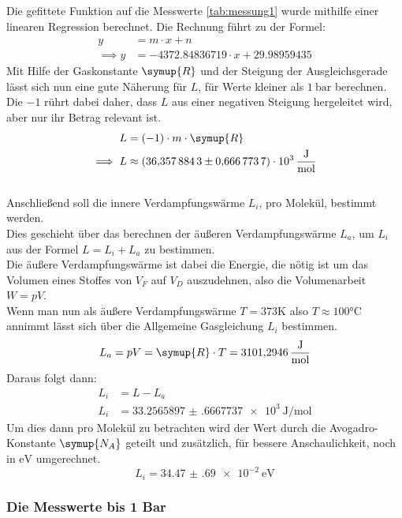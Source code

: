 Die gefittete Funktion auf die Messwerte \ref{tab:messung1} wurde mithilfe einer linearen Regression berechnet.
Die Rechnung führt zu der Formel:
\begin{align}
    y&=m\cdot x+n \nonumber\\
    \implies y&=-4372.84836719 \cdot x+29.98959435 \nonumber
\end{align}
Mit Hilfe der Gaskonstante $\symup{R}$ \cite{Chemie.de-Gaskonstante}
und der Steigung der Ausgleichsgerade lässt sich nun eine gute Näherung für $L$, für Werte kleiner als $\SI{1}{\bar}$ berechnen.
Die $-1$ rührt dabei daher, dass $L$ aus einer negativen Steigung hergeleitet wird, aber nur ihr Betrag relevant ist.
\begin{align}
    L&=(-1) \cdot m \cdot \symup{R} \nonumber\\
    \implies L&\approx\SI{36.3578843(6667737)e3}{\joule\per\mol} \nonumber
\end{align}\\
Anschließend soll die innere Verdampfungswärme $L_i$, pro Molekül, bestimmt werden.\\
Dies geschieht über das berechnen der äußeren Verdampfungswärme $L_a$, um $L_i$ aus der Formel $L=L_i+L_a$ zu bestimmen.\\
Die äußere Verdampfungswärme ist dabei die Energie, die nötig ist um das Volumen eines Stoffes von $V_F$ auf $V_D$ auszudehnen,
also die Volumenarbeit $W=pV$.\\
Wenn man nun als äußere Verdampfungswärme $T=373 \si{\kelvin}$ also $T\approx 100 \si{\celsius}$ annimmt lässt sich über die Allgemeine Gasgleichung $L_i$ bestimmen.
\begin{equation}
    L_a=pV=\symup{R} \cdot T = \SI{3101.2946}{\joule\per\mol} \nonumber
\end{equation}
Daraus folgt dann:
\begin{align}
    L_i&=L-L_a \nonumber\\
    L_i&=\SI{33.2565897(6667737)e3}{\joule\per\mol} \nonumber
\end{align}
Um dies dann pro Molekül zu betrachten wird der Wert durch die Avogadro-Konstante $\symup{N_A}$ \cite{Chemie.de-Avogadro-Konstante}
geteilt und zusätzlich, für bessere Anschaulichkeit,
noch in $\si{\electronvolt}$ umgerechnet.
\begin{equation}
    L_i=\SI{34.47(69)e-2}{\electronvolt} \nonumber
\end{equation}

\clearpage


\subsubsection{Die Messwerte bis 1 Bar}

